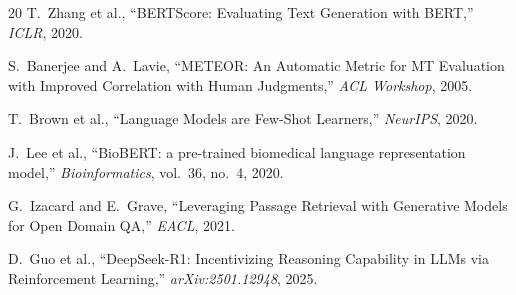 \documentclass[conference]{IEEEtran}
\begin{document}
\begin{thebibliography}{20}
T.~Zhang et al., ``BERTScore: Evaluating Text Generation with BERT,'' \textit{ICLR}, 2020.

S.~Banerjee and A.~Lavie, ``METEOR: An Automatic Metric for MT Evaluation with Improved Correlation with Human Judgments,'' \textit{ACL Workshop}, 2005.

T.~Brown et al., ``Language Models are Few-Shot Learners,'' \textit{NeurIPS}, 2020.

J.~Lee et al., ``BioBERT: a pre-trained biomedical language representation model,'' \textit{Bioinformatics}, vol.~36, no.~4, 2020.

G.~Izacard and E.~Grave, ``Leveraging Passage Retrieval with Generative Models for Open Domain QA,'' \textit{EACL}, 2021.

D.~Guo et al., ``DeepSeek-R1: Incentivizing Reasoning Capability in LLMs via Reinforcement Learning,'' \textit{arXiv:2501.12948}, 2025.

\end{thebibliography}
\end{document}
